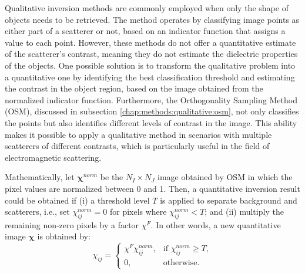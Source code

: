 			
			Qualitative inversion methods are commonly employed when only the shape of objects needs to be retrieved. The method operates by classifying image points as either part of a scatterer or not, based on an indicator function that assigns a value to each point. However, these methods do not offer a quantitative estimate of the scatterer's contrast, meaning they do not estimate the dielectric properties of the objects. One possible solution is to transform the qualitative problem into a quantitative one by identifying the best classification threshold and estimating the contrast in the object region, based on the image obtained from the normalized indicator function. Furthermore, the Orthogonality Sampling Method (OSM), discussed in subsection \ref{chap:methods:qualitative:osm}, not only classifies the points but also identifies different levels of contrast in the image. This ability makes it possible to apply a qualitative method in scenarios with multiple scatterers of different contrasts, which is particularly useful in the field of electromagnetic scattering.
			
			Mathematically, let $\boldsymbol{\chi}^{norm}$ be the $N_I\times N_J$ image obtained by OSM in which the pixel values are normalized between 0 and 1. Then, a quantitative inversion result could be obtained if (i) a threshold level $T$ is applied to separate background and scatterers, i.e., set $\chi^{norm}_{ij} = 0$ for pixels where $\chi^{norm}_{ij} < T$; and (ii) multiply the remaining non-zero pixels by a factor $\chi^F$. In other words, a new quantitative image $\boldsymbol{\chi}$ is obtained by:
			\begin{equation}
				\chi_{ij} = \begin{cases}
					\chi^F\chi^{norm}_{ij},& \text{if }\chi^{norm}_{ij} \ge T, \\
					0, & \text{otherwise.}
				\end{cases} \label{eq:proposed-methodology:surrogate:optimization:transformation}
			\end{equation}
			

